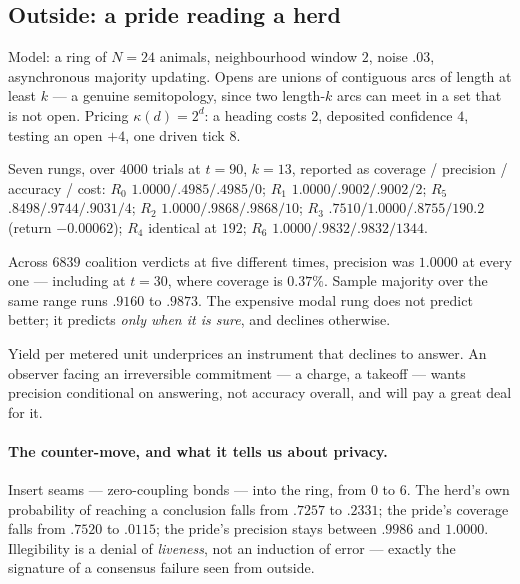 \subsection{Outside: a pride reading a herd}

Model: a ring of $N = 24$ animals, neighbourhood window $2$, noise $.03$,
asynchronous majority updating. Opens are unions of contiguous arcs of length at
least $k$ --- a genuine semitopology, since two length-$k$ arcs can meet in a set
that is not open. Pricing $\kappa(d) = 2^{d}$: a heading costs $2$, deposited
confidence $4$, testing an open $+4$, one driven tick $8$.

Seven rungs, over $4000$ trials at $t=90$, $k=13$, reported as
coverage / precision / accuracy / cost: $R_{0}$ $1.0000/.4985/.4985/0$; $R_{1}$
$1.0000/.9002/.9002/2$; $R_{5}$ $.8498/.9744/.9031/4$; $R_{2}$
$1.0000/.9868/.9868/10$; $R_{3}$ $.7510/1.0000/.8755/190.2$ (return $-0.00062$);
$R_{4}$ identical at $192$; $R_{6}$ $1.0000/.9832/.9832/1344$.

\begin{observation}
\label{obs:irrev}
Across $6839$ coalition verdicts at five different times, precision was $1.0000$ at
every one --- including at $t=30$, where coverage is $0.37\%$. Sample majority over
the same range runs $.9160$ to $.9873$. The expensive modal rung does not predict
better; it predicts \emph{only when it is sure}, and declines otherwise.
\end{observation}

\begin{principle}
Yield per metered unit underprices an instrument that declines to answer. An
observer facing an irreversible commitment --- a charge, a takeoff --- wants
precision conditional on answering, not accuracy overall, and will pay a great
deal for it.
\end{principle}

\paragraph{The counter-move, and what it tells us about privacy.} Insert seams ---
zero-coupling bonds --- into the ring, from $0$ to $6$. The herd's own probability
of reaching a conclusion falls from $.7257$ to $.2331$; the pride's coverage falls
from $.7520$ to $.0115$; the pride's precision stays between $.9986$ and $1.0000$.
Illegibility is a denial of \emph{liveness}, not an induction of error --- exactly
the signature of a consensus failure seen from outside.

